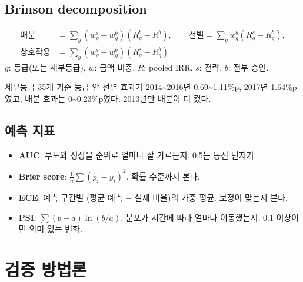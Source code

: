 \documentclass[11pt]{report}
\begin{document}
\section{Brinson decomposition}
\begin{formulabox}
\begin{align*}
\text{배분}&=\sum_g (w^s_g-w^b_g)(R^b_g-R^b), \qquad
\text{선별}=\sum_g w^b_g(R^s_g-R^b_g),\\
\text{상호작용}&=\sum_g (w^s_g-w^b_g)(R^s_g-R^b_g)
\end{align*}
$g$: 등급(또는 세부등급), $w$: 금액 비중, $R$: pooled IRR, $s$: 전략, $b$: 전부 승인.
\end{formulabox}
\begin{keybox}[결과]
세부등급 35개 기준 등급 안 선별 효과가 2014\textasciitilde 2016년 0.69\textasciitilde 1.11\%p, 2017년 1.64\%p였고, 배분 효과는 0\textasciitilde 0.23\%p였다. 2013년만 배분이 더 컸다.
\end{keybox}

\section{예측 지표}
\begin{itemize}
\item \textbf{AUC}: 부도와 정상을 순위로 얼마나 잘 가르는지. 0.5는 동전 던지기.
\item \textbf{Brier score}: $\frac1n\sum(\hat p_i-y_i)^2$. 확률 수준까지 본다.
\item \textbf{ECE}: 예측 구간별 (평균 예측 $-$ 실제 비율)의 가중 평균. 보정이 맞는지 본다.
\item \textbf{PSI}: $\sum(b-a)\ln(b/a)$. 분포가 시간에 따라 얼마나 이동했는지. 0.1 이상이면 의미 있는 변화.
\end{itemize}

\chapter{검증 방법론}
\end{document}
